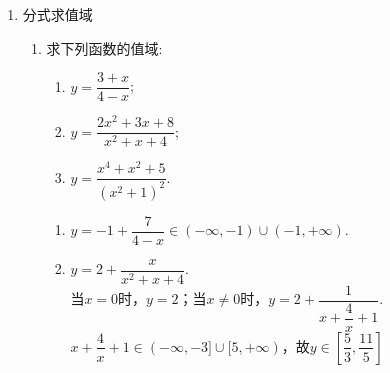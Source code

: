 \begin{enumerate}
\begin{enumerate}
    \item $f(x) = 6-2x$的值域为$[-4, 10)$，则函数$f(x)$的定义域为\blkda{$(-2, 5]$}
    \item 已知函数$f(x) = x^2$的值域为$[0, 36]$，则下列区间中可以作为$f(x)$的定义域的有 \\
    $[2, 6]$，$[-2, 6]$，$[-6, 6]$，$[0, 6]$
    \item 若函数$f(x)=x^2-3x-4$的定义域为$[0,m]$, 值域为$\left[-\dfrac{25}{4},-4\right]$, 则实数$m$的取值范围是. 
    \begin{jieda}
    $f(x)=x^2-3x-4=(x-\dfrac{3}{2})^2-\dfrac{25}{4}$，因此$x = \dfrac{3}{2}$是函数值$-\dfrac{25}{4}$对应的唯一自变量，必然要在定义域内. 又因为$f(0)=f(3)=-4$, 是$f(x)=-4$唯二的解. 于是由二次函数的图像易得$m\in\left[\dfrac{3}{2},3\right]$. 
    \end{jieda}
    \item 若一系列函数的解析式相同, 值域相同, 但其定义域不同, 则称这些函数为``同族函数'', 
    那么函数解析式为$f(x)=x^2$, 值域为$\{1,4\}$的``同族函数''共有个.
    \begin{jieda}
    $1,-1,\pm1\to 1$, $2,-2,\pm2\to 4$, 于是从值域的角度, $x$的组合共有$3\times3=9$种选择. \\
    \ps 关键是要清楚一个$y$对应几个$x$.
    \end{jieda} 
\end{enumerate}

\item 分式求值域
\begin{enumerate}
    \item 求下列函数的值域: 
    \begin{enumerate}
    \item $y=\dfrac{3+x}{4-x}$;
    \item $y=\dfrac{2x^2+3x+8}{x^2+x+4}$; 
    \item $y=\dfrac{x^4+x^2+5}{(x^2+1)^2}$.
    \end{enumerate}
    \begin{jieda}
    \begin{enumerate}
    \item $y=-1+\dfrac{7}{4-x}\in(-\infty,-1)\cup(-1,+\infty)$. 
    
    \item $y=2+\dfrac{x}{x^2+x+4}$. \\
    当$x = 0$时，$y = 2$；当$x \neq 0$时，$y = 2 + \dfrac{1}{x + \dfrac{4}{x} + 1}$.\\
    $x + \dfrac{4}{x} + 1 \in (-\infty, -3]\cup [5, +\infty)$，故$y \in [\dfrac{5}{3}, \dfrac{11}{5}]$
    

\end{enumerate}
\end{jieda}
\end{enumerate}
\end{enumerate}
